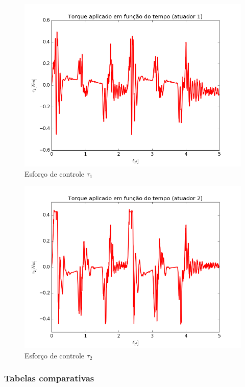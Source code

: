 \documentclass[]{politex}
\begin{document}
\begin{multicols}{2}
\begin{figure}[H]
	\centering
	\includegraphics[scale=0.39]{../../../Experimental/Aquisicoes/SMCx_triangulo/tau1.png}  
	\caption{Esforço de controle $\tau_1$}
	\label{fig:SMCx_triangulo_tau1}
\end{figure}
\begin{figure}[H]
	\centering
	\includegraphics[scale=0.39]{../../../Experimental/Aquisicoes/SMCx_triangulo/tau2.png}  
	\caption{Esforço de controle $\tau_2$}
	\label{fig:SMCx_triangulo_tau2}
\end{figure}
\end{multicols}

\subsubsection{Tabelas comparativas}
\end{document}
